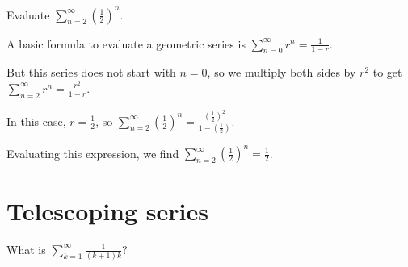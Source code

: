 \documentclass{ximera}
\begin{document}
\begin{question}
  Evaluate \(\displaystyle\sum_{n=2}^\infty \left(\displaystyle\frac{1}{2}\right)^{n}\).

  \begin{solution}
    \begin{hint}
      A basic formula to evaluate a geometric series is \(\displaystyle\sum_{n=0}^\infty r^{n} = \displaystyle\frac{1}{1-r}\).
    \end{hint}
    \begin{hint}
      But this series does not start with \(n=0\), so we multiply both sides by \(r^{2}\) to get  \(\displaystyle\sum_{n=2}^\infty r^{n} = \displaystyle\frac{r^{2}}{1-r}\).
    \end{hint}
    \begin{hint}
      In this case, \(r = \displaystyle\frac{1}{2}\), so \(\displaystyle\sum_{n=2}^\infty \left( \displaystyle\frac{1}{2} \right)^{n} = \displaystyle\frac{\left( \displaystyle\frac{1}{2} \right)^{2}}{1-\left(\displaystyle\frac{1}{2}\right)}\).
    \end{hint}
    \begin{hint}
      Evaluating this expression, we find \(\displaystyle\sum_{n=2}^\infty \left( \displaystyle\frac{1}{2} \right)^{n} = \displaystyle\frac{1}{2}\).
    \end{hint}


    \begin{multiple-choice}
      
    \end{multiple-choice}
    
  \end{solution}
\end{question}

\section{Telescoping series}

What is $\displaystyle\sum_{k=1}^\infty \frac{1}{(k+1)k}$?

\end{document}
